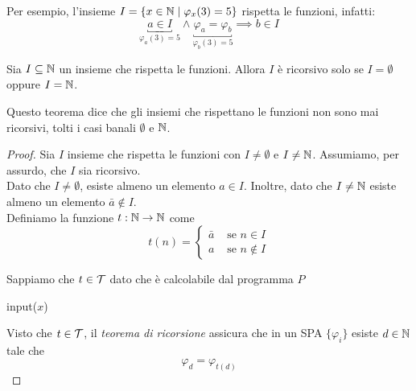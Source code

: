 Per esempio, l'insieme $I = \left\{x \in \mathbb{N} \mid \varphi_x (3) = 5 \right\}$ rispetta le funzioni, infatti: 
$$ 
\underbracket{a \in I}_{\varphi_a (3) = 5} \wedge \underbracket{\varphi_a = \varphi_b}_{\varphi_b(3) = 5} \implies b \in I
$$

\begin{theor}
	Sia $I \subseteq \mathbb{N}$ un insieme che rispetta le funzioni. Allora $I$ è ricorsivo solo se $I = \emptyset$ oppure $I = \mathbb{N}$.
\end{theor}
Questo teorema dice che gli insiemi che rispettano le funzioni non sono mai ricorsivi, tolti i casi banali $\emptyset$ e $\mathbb{N}$.\\

\begin{proof}
	Sia $I$ insieme che rispetta le funzioni con $I \neq \emptyset$ e $I \neq \mathbb{N}$. Assumiamo, per assurdo, che $I$ sia ricorsivo.\\
	
	Dato che $I \neq \emptyset$, esiste almeno un elemento $a \in I$. Inoltre, dato che $I \neq \mathbb{N}$ esiste almeno un elemento $\bar{a} \notin I$.\\
	
	Definiamo la funzione $t: \mathbb{N} \rightarrow \mathbb{N}$ come
	$$ 
	t(n) = \begin{cases}
		\bar{a} & \text{ se } n \in I \\
		a & \text{ se } n \notin I
	\end{cases}
	$$
	
	Sappiamo che $t \in \mathcal{T}$ dato che è calcolabile dal programma $P$
	\begin{center}
		\begin{minipage}{.45\textwidth}
			\begin{tcolorbox}[
				colback=white,
				sharp corners,
				boxrule=.3mm,
				left=20pt,
				top=0pt,
				bottom=0pt,
				colbacktitle=white,
				coltitle=black
				]
				\begin{algorithm}[H]
					input($x$)\\
				\end{algorithm}
			\end{tcolorbox}
		\end{minipage}
	\end{center}
	Visto che $t \in \mathcal{T}$, il \textit{teorema di ricorsione} assicura che in un SPA $\{\varphi_i\}$ esiste $d \in \mathbb{N}$ tale che 
	$$ \varphi_d = \varphi_{t(d)} $$


\end{proof}
